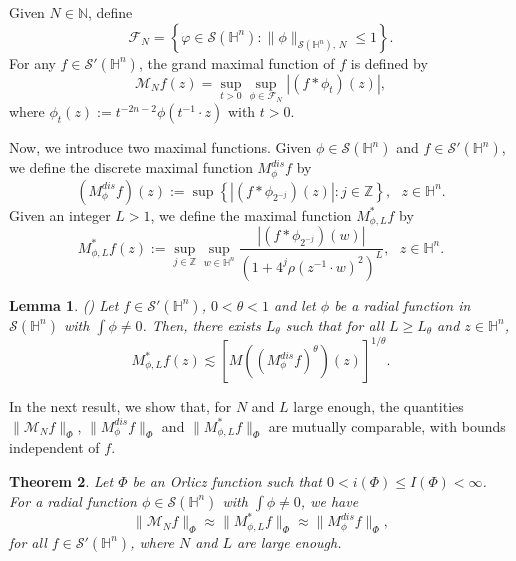 \documentclass[oneside,10pt]{article}
\newtheorem{theorem}{Theorem}
\newtheorem{lemma}[theorem]{Lemma}
\begin{document}
Given $N \in \mathbb{N}$, define 
\[
\mathcal{F}_{N}=\left\{ \varphi \in \mathcal{S}(\mathbb{H}^{n}) : \| \phi \|_{\mathcal{S}(\mathbb{H}^{n}), \, N} \leq 1\right\}.
\]
For any $f \in \mathcal{S}'(\mathbb{H}^{n})$, the grand maximal function of $f$ is defined by 
\[
\mathcal{M}_N f(z)=\sup\limits_{t>0}\sup\limits_{\phi \in \mathcal{F}_{N}}\left\vert \left( f \ast \phi_t \right)(z) \right\vert,
\]
where $\phi_t(z) := t^{-2n-2} \phi(t^{-1} \cdot z)$ with $t > 0$. 

Now, we introduce two maximal functions. Given $\phi \in \mathcal{S}(\mathbb{H}^n)$ and $f \in \mathcal{S}'(\mathbb{H}^n)$, we define the discrete maximal function $M_{\phi}^{dis}f$ by
\[
(M_{\phi}^{dis}f)(z) := \sup \left\{ |(f \ast \phi_{2^{-j}})(z)| : j \in \mathbb{Z} \right\}, \,\,\,\, z \in \mathbb{H}^n.
\]
Given an integer $L > 1$, we define the maximal function $M_{\phi, L}^{*}f$ by
\[
M_{\phi, L}^{*}f(z) := \sup_{j \in \mathbb{Z}} \sup_{w \in \mathbb{H}^n} \frac{|(f \ast \phi_{2^{-j}})(w)|}{(1+ 4^{j} \rho(z^{-1} \cdot w)^2)^L}, 
\,\,\,\, z \in \mathbb{H}^n.
\]

\begin{lemma} (\cite[Lemma 3.4]{Fang}) \label{M star y phi}
Let $f \in \mathcal{S}'(\mathbb{H}^n)$, $0 < \theta < 1$ and let $\phi$ be a radial function in $\mathcal{S}(\mathbb{H}^n)$ with 
$\int \phi \neq 0$. Then, there exists $L_{\theta}$ such that for all $L \geq L_{\theta}$ and $z \in \mathbb{H}^n$,
\[
M_{\phi, L}^{*}f(z) \lesssim \left[ M \left( (M_{\phi}^{dis}f)^{\theta} \right)(z) \right]^{1/\theta}.
\]
\end{lemma}

In the next result, we show that, for $N$ and $L$ large enough, the quantities $\| \mathcal{M}_{N}f \|_{\Phi}$, 
$\| M_{\phi}^{dis}f \|_{\Phi}$ and $\| M_{\phi, L}^{*} f \|_{\Phi}$ are mutually comparable, with bounds independent of $f$.

\begin{theorem} \label{norm comparable}
Let $\Phi$ be an Orlicz function such that $0 < i(\Phi) \leq I(\Phi) < \infty$. For a radial function $\phi \in \mathcal{S}(\mathbb{H}^n)$ with $\int \phi \neq 0$, we have
\[
\| \mathcal{M}_{N}f \|_{\Phi} \approx \| M_{\phi, L}^{*} f \|_{\Phi} \approx \| M_{\phi}^{dis}f \|_{\Phi},
\]
for all $f \in \mathcal{S}'(\mathbb{H}^n)$, where $N$ and $L$ are large enough.
\end{theorem}
\end{document}
